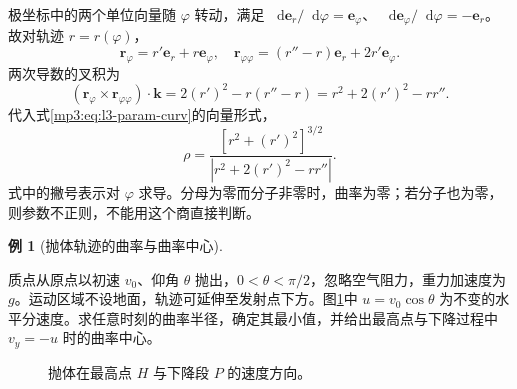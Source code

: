 \documentclass[11pt,openany,fontset=fandol]{ctexbook}
\theoremstyle{definition}\newtheorem{example}{例}[chapter]\newtheorem{exercise}{习题}[chapter]
\newcommand{\dd}{\mathop{}\!\mathrm d}\newcommand{\ee}{\mathrm e}\newcommand{\vct}[1]{\bm{#1}}
\begin{document}
极坐标中的两个单位向量随 $\varphi$ 转动，满足
$\dd\vct e_r/\dd\varphi=\vct e_\varphi$、
$\dd\vct e_\varphi/\dd\varphi=-\vct e_r$。故对轨迹 $r=r(\varphi)$，
\[
\vct r_\varphi=r'\vct e_r+r\vct e_\varphi,\quad
\vct r_{\varphi\varphi}=(r''-r)\vct e_r+2r'\vct e_\varphi.
\]
两次导数的叉积为
\[
(\vct r_\varphi\times\vct r_{\varphi\varphi})\cdot\vct k
=2(r')^2-r(r''-r)=r^2+2(r')^2-rr''.
\]
代入式\eqref{mp3:eq:l3-param-curv}的向量形式，
\begin{equation}\label{mp3:eq:l3-polar-curv}
\rho=\frac{[r^2+(r')^2]^{3/2}}
{|r^2+2(r')^2-rr''|}.
\end{equation}
式中的撇号表示对 $\varphi$ 求导。分母为零而分子非零时，曲率为零；若分子也为零，则参数不正则，不能用这个商直接判断。

\par\medskip\noindent\begin{minipage}{\textwidth}
\begin{example}[抛体轨迹的曲率与曲率中心]\label{mp3:example:l3-e1}

质点从原点以初速 $v_0$、仰角 $\theta$ 抛出，$0<\theta<\pi/2$，忽略空气阻力，重力加速度为 $g$。运动区域不设地面，轨迹可延伸至发射点下方。图\ref{mp3:fig:l3-e1-q}中 $u=v_0\cos\theta$ 为不变的水平分速度。求任意时刻的曲率半径，确定其最小值，并给出最高点与下降过程中 $v_y=-u$ 时的曲率中心。

\end{example}
\begin{figure}[H]\centering
{}
\caption{抛体在最高点 $H$ 与下降段 $P$ 的速度方向。}\label{mp3:fig:l3-e1-q}
\end{figure}
\end{minipage}\par\medskip
\end{document}
